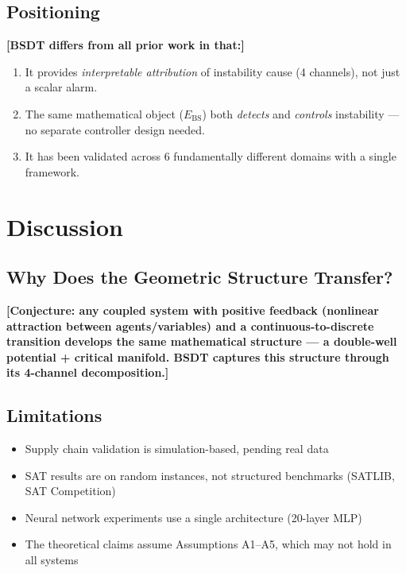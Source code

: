 \documentclass[11pt,a4paper]{article}
\newcommand{\Ebs}{E_{\mathrm{BS}}}
\begin{document}
\subsection{Positioning}
\textbf{[BSDT differs from all prior work in that:]}
\begin{enumerate}[nosep]
  \item It provides \emph{interpretable attribution} of instability cause
        (4 channels), not just a scalar alarm.
  \item The same mathematical object ($\Ebs$) both \emph{detects} and
        \emph{controls} instability — no separate controller design needed.
  \item It has been validated across 6 fundamentally different domains with
        a single framework.
\end{enumerate}


\section{Discussion}\label{sec:discussion}

\subsection{Why Does the Geometric Structure Transfer?}

\textbf{[Conjecture: any coupled system with positive feedback
(nonlinear attraction between agents/variables) and a
continuous-to-discrete transition develops the same mathematical
structure — a double-well potential + critical manifold. BSDT
captures this structure through its 4-channel decomposition.]}

\subsection{Limitations}
\begin{itemize}[nosep]
  \item Supply chain validation is simulation-based, pending real data
  \item SAT results are on random instances, not structured benchmarks
        (SATLIB, SAT Competition)
  \item Neural network experiments use a single architecture (20-layer MLP)
  \item The theoretical claims assume Assumptions A1--A5, which may
        not hold in all systems
\end{itemize}
\end{document}
